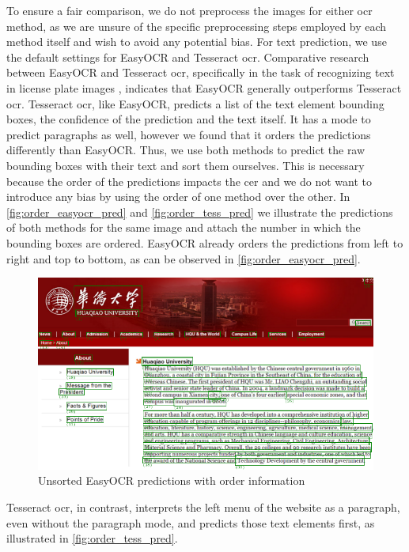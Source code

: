 To ensure a fair comparison, we do not preprocess the images for either \gls{ocr} method, as we are unsure of the specific preprocessing steps employed by each method itself and wish to avoid any potential bias.
For text prediction, we use the default settings for EasyOCR and Tesseract \gls{ocr}.
Comparative research between EasyOCR and Tesseract \gls{ocr}, specifically in the task of recognizing text in license plate images \cite{ocr_tess_vs_easyocr_2022}, indicates that EasyOCR generally outperforms Tesseract \gls{ocr}.
Tesseract \gls{ocr}, like EasyOCR, predicts a list of the text element bounding boxes, the confidence of the prediction and the text itself.
It has a mode to predict paragraphs as well, however we found that it orders the predictions differently than EasyOCR.
Thus, we use both methods to predict the raw bounding boxes with their text and sort them ourselves.
This is necessary because the order of the predictions impacts the \gls{cer} and we do not want to introduce any bias by using the order of one method over the other.
In \autoref{fig:order_easyocr_pred} and \autoref{fig:order_tess_pred} we illustrate the predictions of both methods for the same image and attach the number in which the bounding boxes are ordered.
EasyOCR already orders the predictions from left to right and top to bottom, as can be observed in \autoref{fig:order_easyocr_pred}.
\begin{figure}[h!]
    \centering
    \includegraphics[width=\textwidth]{../images/bbox_order_ezocr.pdf}
    \caption{Unsorted EasyOCR predictions with order information}
    \label{fig:order_easyocr_pred}
\end{figure}
Tesseract \gls{ocr}, in contrast, interprets the left menu of the website as a paragraph, even without the paragraph mode, and predicts those text elements first, as illustrated in \autoref{fig:order_tess_pred}.
